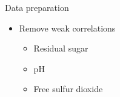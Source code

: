 \begin{frame}{Data preparation}
    \begin{itemize}
        \item Remove weak correlations
        \begin{itemize}
            \item Residual sugar
            \item pH
            \item Free sulfur dioxide
        \end{itemize}
    \end{itemize}
\end{frame}
